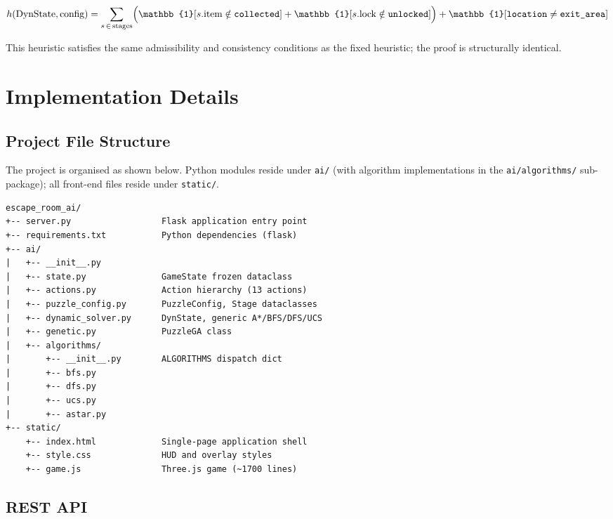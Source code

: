 \documentclass[12pt, a4paper]{report}
\begin{document}
\[
  h(\text{DynState}, \text{config})
  =
  \sum_{s \,\in\, \text{stages}}
  \Bigl(
    \mathbb{1}[s.\text{item} \notin \texttt{collected}]
    + \mathbb{1}[s.\text{lock} \notin \texttt{unlocked}]
  \Bigr)
  + \mathbb{1}[\texttt{location} \neq \texttt{exit\_area}]
\]

This heuristic satisfies the same admissibility and consistency conditions as
the fixed heuristic; the proof is structurally identical.

\chapter{Implementation Details}
\label{chap:implementation}

\section{Project File Structure}

The project is organised as shown below.  Python modules reside under
\texttt{ai/} (with algorithm implementations in the \texttt{ai/algorithms/} sub-package); all front-end files reside under \texttt{static/}.

\begin{verbatim}
escape_room_ai/
+-- server.py                  Flask application entry point
+-- requirements.txt           Python dependencies (flask)
+-- ai/
|   +-- __init__.py
|   +-- state.py               GameState frozen dataclass
|   +-- actions.py             Action hierarchy (13 actions)
|   +-- puzzle_config.py       PuzzleConfig, Stage dataclasses
|   +-- dynamic_solver.py      DynState, generic A*/BFS/DFS/UCS
|   +-- genetic.py             PuzzleGA class
|   +-- algorithms/
|       +-- __init__.py        ALGORITHMS dispatch dict
|       +-- bfs.py
|       +-- dfs.py
|       +-- ucs.py
|       +-- astar.py
+-- static/
    +-- index.html             Single-page application shell
    +-- style.css              HUD and overlay styles
    +-- game.js                Three.js game (~1700 lines)
\end{verbatim}

\section{REST API}
\end{document}
